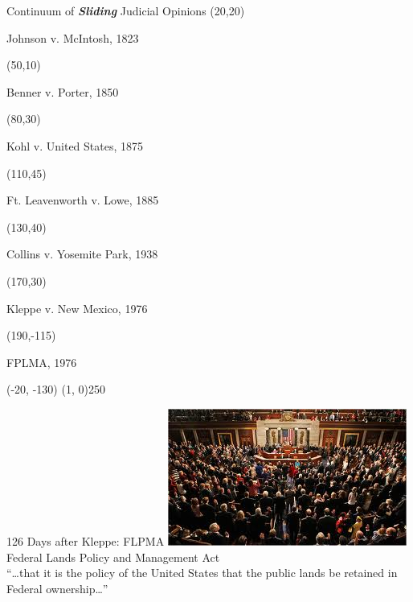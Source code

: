 \begin{frame}{Continuum of \textbf{\emph{Sliding}} Judicial Opinions}
    \Put(20,20){\Large \begin{turn}{50} Johnson v. McIntosh, 1823 \end{turn}}
    \Put(50,10){\Large \begin{turn}{50} Benner v. Porter, 1850 \end{turn}}
    \Put(80,30){\Large \begin{turn}{50} Kohl v. United States, 1875 \end{turn}}
    \Put(110,45){\Large \begin{turn}{50} Ft. Leavenworth v. Lowe, 1885 \end{turn}}
    \Put(130,40){\Large \begin{turn}{50} Collins v. Yosemite Park, 1938 \end{turn}}
    \Put(170,30){\Large \begin{turn}{50} Kleppe v. New Mexico, 1976 \end{turn}}
    \Put(190,-115){\Large \begin{turn}{50} FPLMA, 1976 \end{turn}}
    {
        \color{red}
        \thicklines
        \Put(-20, -130){ \line(1, 0){250} }
    }
\end{frame}


\begin{frame}{126 Days after Kleppe: FLPMA}
    \centering
    \includegraphics[width=.8\textwidth]{img/congress.png} \\
    Federal Lands Policy and Management Act \\
    { \large ``\ldots that it is the policy of the United States that the
    public lands be retained in Federal ownership\ldots'' }
\end{frame}


